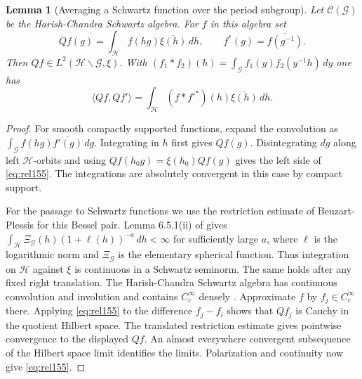 \documentclass[a4paper,11pt]{article}
\newtheorem{lemma}[proposition]{Lemma}
\theoremstyle{definition}
\theoremstyle{remark}
\numberwithin{equation}{section}
\begin{document}
\begin{lemma}[Averaging a Schwartz function over the period subgroup]
\label{lem:rel155}
Let \(\mathcal C(\mathcal G)\) be the Harish-Chandra Schwartz
algebra. For \(f\) in this algebra set
\[
    Qf(g)=\int_{\mathcal H} f(hg)\overline{\xi(h)}\,dh,\qquad
    f^*(g)=\overline{f(g^{-1})}.
\]
Then \(Qf\in L^2(\mathcal H\backslash\mathcal G,\xi)\).
With \((f_1*f_2)(h)=\int_{\mathcal G}f_1(y)f_2(y^{-1}h)\,dy\)
one has
\begin{equation}
 \langle Qf,Qf'\rangle
  =\int_{\mathcal H}(f*f'^{*})(h)\overline{\xi(h)}\,dh .
 \label{eq:rel155}
\end{equation}
\end{lemma}
\begin{proof}
For smooth compactly supported functions, expand the convolution
as \(\int_{\mathcal G} f(hg)\overline{f'(g)}\,dg\).
Integrating in \(h\) first gives \(Qf(g)\).
Disintegrating \(dg\) along left \(\mathcal H\)-orbits and using
\(Qf(h_0g)=\xi(h_0)Qf(g)\) gives the left side of
\eqref{eq:rel155}. The integrations are absolutely convergent
in this case by compact support.

For the passage to Schwartz functions we use the restriction
estimate of Beuzart-Plessis for this Bessel pair. Lemma 6.5.1(ii)
of \cite{XX-XV-IV-bp155} gives
\(\int_{\mathcal H}\Xi_{\mathcal G}(h)(1+\ell(h))^{-a}\,dh
<\infty\) for sufficiently large \(a\), where \(\ell\) is
the logarithmic norm and \(\Xi_{\mathcal G}\) is the elementary
spherical function. Thus integration on \(\mathcal H\) against
\(\overline\xi\) is continuous in a Schwartz seminorm.
The same holds after any fixed right translation. The
Harish-Chandra Schwartz algebra has continuous convolution
and involution and contains \(C_c^\infty\) densely
\cite[Sections 1.5 and 2.6]{XX-XV-IV-bp155}. Approximate \(f\) by
\(f_j\in C_c^\infty\) there. Applying \eqref{eq:rel155} to
the difference \(f_j-f_i\) shows that \(Qf_j\) is Cauchy in
the quotient Hilbert space. The translated restriction estimate
gives pointwise convergence to the displayed \(Qf\).
An almost everywhere convergent subsequence of the Hilbert
space limit identifies the limits. Polarization and continuity
now give \eqref{eq:rel155}.
\end{proof}
\end{document}
